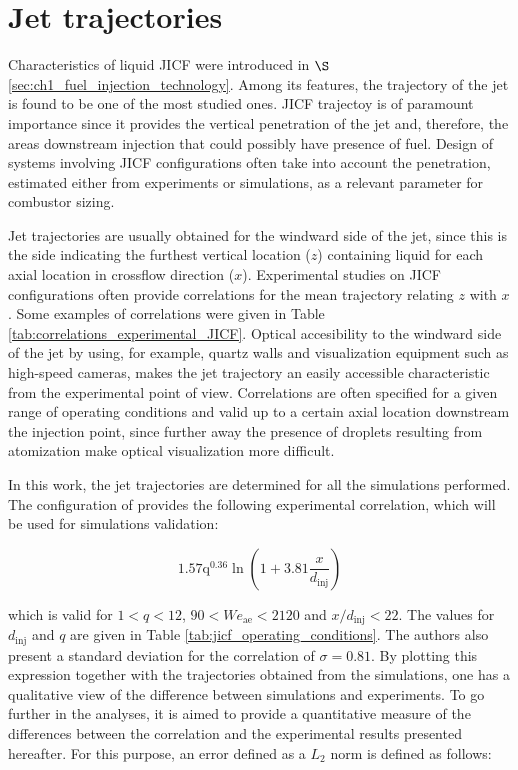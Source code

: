 \clearpage

\section{Jet trajectories}
\label{subsec:ch5_jet_trajectories_results}

Characteristics of liquid JICF were introduced in $\S$\ref{sec:ch1_fuel_injection_technology}. Among its features, the trajectory of the jet is found to be one of the most studied ones. JICF trajectoy is of paramount importance since it provides the vertical penetration of the jet and, therefore, the areas downstream injection that could possibly have presence of fuel. Design of systems involving JICF configurations often take into account the penetration, estimated either from experiments or simulations, as a relevant parameter for combustor sizing.

Jet trajectories are usually obtained for the windward side of the jet, since this is the side indicating the furthest vertical location ($z$) containing liquid for each axial location in crossflow direction ($x$). Experimental studies on JICF configurations often provide correlations for the mean trajectory relating $z$ with $x$. Some examples of correlations were given in Table \ref{tab:correlations_experimental_JICF}. Optical accesibility to the windward side of the jet by using, for example, quartz walls and visualization equipment such as high-speed cameras, makes the jet trajectory an easily accessible characteristic from the experimental point of view. Correlations are often specified for a given range of operating conditions and valid up to a certain axial location downstream the injection point, since further away the presence of droplets resulting from atomization make optical visualization more difficult.

In this work, the jet trajectories are determined for all the simulations performed. The configuration of  provides the following experimental correlation, which will be used for simulations validation:

\begin{equation}
1.57 \mathrm{q}^{0.36} \ln \left( 1 + 3.81 \frac{x}{d_\mathrm{inj}} \right)
\end{equation}

which is valid for $1 < q < 12$, $90 < We_\mathrm{ae} < 2120$ and $x/d_\mathrm{inj} < 22$. The values for $d_\mathrm{inj}$ and $q$ are given
in Table \ref{tab:jicf_operating_conditions}. The authors also present a standard deviation for the correlation of $\sigma = 0.81$. By plotting this expression together with the trajectories obtained from the simulations, one has a qualitative view of the difference between simulations and experiments. To go further in the analyses, it is aimed to provide a quantitative measure of the differences between the correlation and the experimental results presented hereafter. For this purpose, an error defined as a $L_2$ norm is defined as follows:

